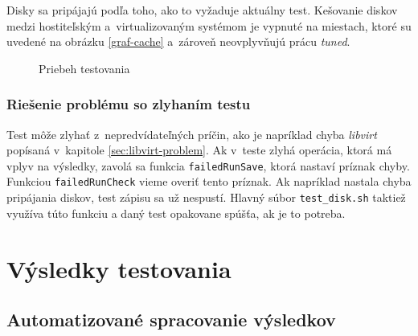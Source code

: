 Disky sa pripájajú podľa toho, ako to vyžaduje aktuálny test. Kešovanie diskov
medzi hostiteľským a~virtualizovaným systémom je vypnuté na miestach, ktoré su
uvedené na obrázku \ref{graf-cache} a~zároveň neovplyvňujú prácu \emph{tuned}. 

%
%

\begin{figure}[H]
\begin{center}
  \caption{Priebeh testovania}
  \label{pic:testflow}
\end{center}
\end{figure}
%
%

\subsection{Riešenie problému so zlyhaním testu}
\label{sec:test-failure}

Test môže zlyhať z~nepredvídateľných príčin, ako je napríklad chyba
\emph{libvirt} popísaná v~kapitole \ref{sec:libvirt-problem}. Ak v~teste zlyhá
operácia, ktorá má vplyv na výsledky, zavolá sa funkcia \texttt{failedRunSave},
ktorá nastaví príznak chyby. Funkciou \texttt{failedRunCheck} vieme overiť
tento príznak. Ak napríklad nastala chyba pripájania diskov, test zápisu sa už
nespustí. Hlavný súbor \texttt{test\_disk.sh} taktiež využíva túto funkciu a
daný test opakovane spúšťa, ak je to potreba.

%
%

\chapter{Výsledky testovania}
\label{chap:test-results}

\section{Automatizované spracovanie výsledkov}

